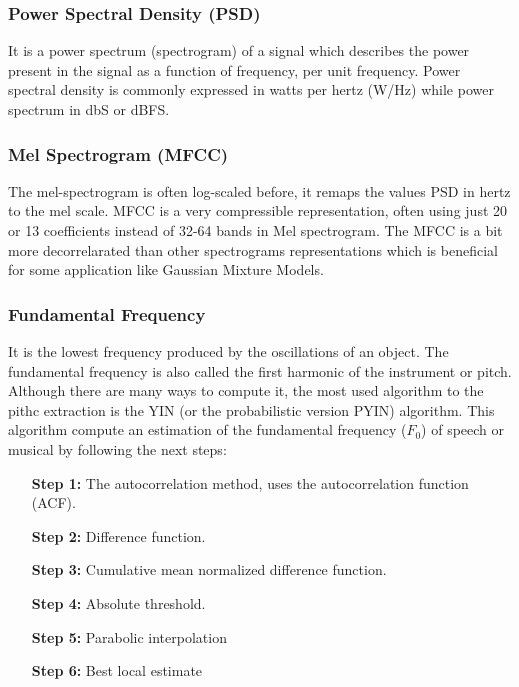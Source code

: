 \subsubsection{Power Spectral Density (PSD)}

It is a power spectrum (spectrogram) of a signal which describes the power present in the signal as a function of frequency, per unit frequency. Power spectral density is commonly expressed in watts per hertz (W/Hz) while power spectrum in dbS or dBFS.

\subsubsection{Mel Spectrogram (MFCC)}

The mel-spectrogram is often log-scaled before, it remaps the values PSD in hertz to the mel scale. MFCC is a very compressible representation, often using just 20 or 13 coefficients instead of 32-64 bands in Mel spectrogram. The MFCC is a bit more decorrelarated than other spectrograms representations which is beneficial for some application like Gaussian Mixture Models.


\subsubsection{Fundamental Frequency}

It is the lowest frequency produced by the oscillations of an object. The fundamental frequency is also called the first harmonic of the instrument or pitch.\\

Although there are many ways to compute it, the most used algorithm to the pithc extraction is the YIN (or the probabilistic version PYIN) algorithm. This algorithm compute an estimation of the fundamental frequency ($F_0$) of speech or musical by following the next steps:

\begin{enumerate}
    \item[\textbf{Step 1:}] The autocorrelation method, uses the autocorrelation function (ACF).
    \item[\textbf{Step 2:}] Difference function.
    \item[\textbf{Step 3:}] Cumulative mean normalized difference function.
    \item[\textbf{Step 4:}] Absolute threshold.
    \item[\textbf{Step 5:}] Parabolic interpolation
    \item[\textbf{Step 6:}] Best local estimate
\end{enumerate}

